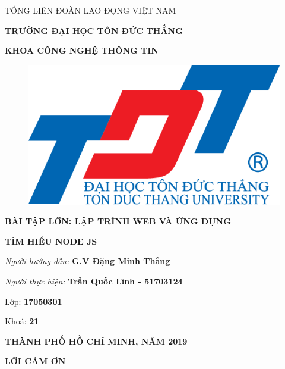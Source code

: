 \documentclass{report}
\begin{document}
\newpage
\changefontsizes[14pt]{12pt}
\centerline{TỔNG LIÊN ĐOÀN LAO ĐỘNG VIỆT NAM}

\changefontsizes[14pt]{11pt}
\centerline{\textbf{TRƯỜNG ĐẠI HỌC TÔN ĐỨC THẮNG}}
\centerline{\textbf{KHOA CÔNG NGHỆ THÔNG TIN}}

\begin{center}
    \begin{figure}[htp]
    \begin{center}
     \includegraphics[scale=.2]{logo}
    \end{center}
    \end{figure}
\end{center}

\changefontsizes{16pt}
\centerline{\textbf{BÀI TẬP LỚN: LẬP TRÌNH WEB VÀ ỨNG DỤNG}}
\vspace{1.5cm}
\changefontsizes{24pt}
\centerline{\textbf{TÌM HIỂU NODE JS}}

\vspace{4cm}
\begin{flushright}
\renewcommand{\baselinestretch}{0.05}
\changefontsizes{14pt}
\textit{Người hướng dẫn: }\textbf{G.V Đặng Minh Thắng}
\setlength{\parskip}{0.5em}

\textit{Người thực hiện: }\textbf{Trần Quốc Lĩnh - 51703124}
\setlength{\parskip}{0.5em}

Lớp: \textbf{17050301}
\setlength{\parskip}{0.5em}

Khoá: \textbf{21}
\setlength{\parskip}{0.5em}

\end{flushright}

\vspace{1cm}
\changefontsizes{14pt}
\centerline{\textbf{THÀNH PHỐ HỒ CHÍ MINH, NĂM 2019}}


\newpage
\changefontsizes{16pt}
\centerline{\textbf{LỜI CẢM ƠN}}
\end{document}
